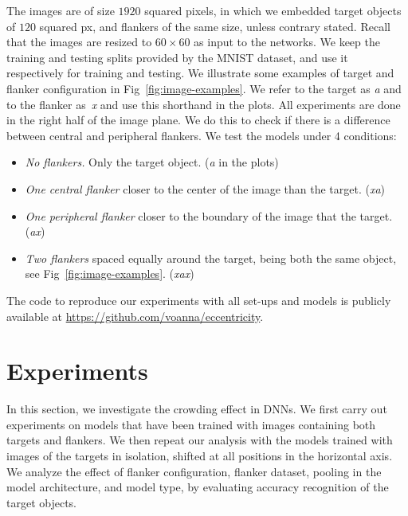 \documentclass{article}
\begin{document}
The images are of size $1920$ squared pixels, in which we embedded target objects of $120$ squared px, and flankers of the same size, unless contrary stated. Recall that the images are resized to $60 \times 60$ as input to the networks. 
We keep the training and testing splits provided by the MNIST dataset, and use it respectively for training and testing. We illustrate some examples of target and flanker configuration in Fig~\ref{fig:image-examples}. We refer to the target as \emph{a} and to the flanker as~\emph{x} and use this shorthand in the plots. 
All experiments are done in the right half of the image plane.  We do this to check if there is a difference between central and peripheral flankers. We test the models under 4 conditions:
\begin{itemize}[noitemsep,topsep=0pt,partopsep=0px,leftmargin=*]
\item \emph{No flankers.} Only the target object. (\emph{a} in the plots)
\item \emph{One central flanker} closer to the center of the image than the target. (\emph{xa})
\item \emph{One peripheral flanker} closer to the boundary of the image that the target. (\emph{ax})
\item \emph{Two flankers} spaced equally around the target, being both the same object, see Fig~\ref{fig:image-examples}. (\emph{xax})
\end{itemize}

The code to reproduce our experiments with all set-ups and models is publicly available at {\url{https://github.com/voanna/eccentricity}}.

\vspace*{-0.20cm}\section{Experiments}\vspace*{-0.20cm}
In this section, we investigate the crowding effect in DNNs.
We first carry out experiments on models that have been trained with images containing both targets and flankers.  We then repeat our analysis with the models trained with images of the targets in isolation, shifted at all positions in the horizontal axis.
We analyze the effect of flanker configuration, flanker dataset, pooling in the model architecture, and model type, by evaluating accuracy recognition of the target objects.   
\end{document}
